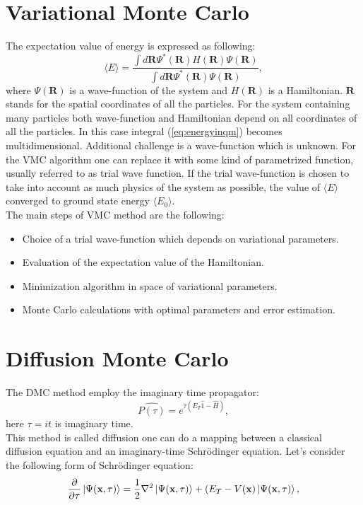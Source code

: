 \documentclass[twoside,english]{uiofysmaster}
\theoremstyle{definition}
\begin{document}
\section{Variational Monte Carlo} \label{sec:VMC}
The expectation value of energy is expressed as following:
\begin{equation}\label{eq:energyinqm}
\langle E \rangle = \frac{\int d\boldsymbol{R}\Psi^{\ast}(\boldsymbol{R})H(\boldsymbol{R})\Psi(\boldsymbol{R})}
{\int d\boldsymbol{R}\Psi^{\ast}(\boldsymbol{R})\Psi(\boldsymbol{R})},
\end{equation}
where $\Psi(\boldsymbol{R})$ is a wave-function of the system and $H(\boldsymbol{R})$ is a Hamiltonian. $\boldsymbol{R}$ stands for the spatial coordinates of all the particles. For the system containing many particles both wave-function and Hamiltonian depend on all coordinates of all the particles. In this case integral (\ref{eq:energyinqm}) becomes multidimensional.  Additional challenge is a wave-function which is unknown. For the VMC algorithm  one can replace it with some kind of parametrized function, usually referred to as trial wave function. If the trial wave-function is chosen to take into account as much physics of the system as possible, the value of $\langle E \rangle$ converged to ground state energy $\langle E_0 \rangle$.\\

The main steps of VMC method are the following:
\begin{itemize}
	\item Choice of a trial wave-function which depends on variational parameters.
	\item Evaluation of the expectation value of the Hamiltonian.
	\item Minimization algorithm in space of variational parameters.
	\item Monte Carlo calculations with optimal parameters and error estimation.
\end{itemize}




\section{Diffusion Monte Carlo} \label{sec:DMC}
The DMC method employ the imaginary time propagator:
\begin{equation}
\hat{P(\tau)}=e^{\tau(E_T\hat{1}- \hat{H})},
\end{equation}
here $\tau= it$ is imaginary time.\\
This method is called  diffusion one can do a mapping between a classical diffusion equation and an imaginary-time Schr\"{o}dinger equation. Let's consider the following form of  Schr\"{o}dinger equation:
\begin{equation}\label{eq:imaginary_schrod}
		\frac{\partial }{ \partial \tau}\ket{\Psi(\textbf{x},\tau)} = \frac{1}{2} \nabla^2 \ket{\Psi(\textbf{x},\tau)} + (E_T - V(\textbf{x}) \ket{\Psi(\textbf{x},\tau)},
\end{equation}
\end{document}
